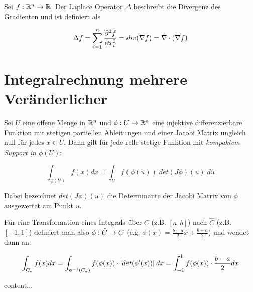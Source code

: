 \begin{definition}
	Sei $f : \mathbb{R}^n \rightarrow \mathbb{R}$. Der Laplace Operator $\Delta$ beschreibt die Divergenz des Gradienten und ist definiert als
	
	\begin{align*}
	\Delta f  = \sum_{i=1}^{n} \frac{\partial ^2f}{\partial x_i^2} = div(\nabla f) = \nabla \cdot (\nabla f)
	\end{align*}
\end{definition}

\pagebreak
	
\section{Integralrechnung mehrere Veränderlicher}

\begin{satz}
	Sei $U$ eine offene Menge in $\mathbb{R}^n$ und $\phi : U \rightarrow \mathbb{R}^n$ eine injektive differenzierbare Funktion mit stetigen partiellen Ableitungen und einer Jacobi Matrix ungleich null für jedes $x \in U$. Dann gilt für jede relle stetige Funktion mit \emph{kompaktem Support in $\phi(U)$}:
	
	\begin{equation}
		\int_{\phi(U)}	 f(x) dx = \int_U f(\phi(u)) |det(J \phi)(u)| du
 	\end{equation}
 	
 	Dabei bezeichnet $det(J \phi)(u)$ die Determinante der Jacobi Matrix von $\phi$ ausgewertet am Punkt $u$.
 	
 	Für eine Transformation eines Integrals über $C$ (z.B. $[a,b]$) nach $\hat{C}$ (z.B. $[-1,1]$) definiert man also $\phi : \hat{C} \rightarrow C$ (e.g. $\phi(x) = \frac{b - a}{2}x + \frac{b + a}{2}$) und wendet dann an:
 	
 	\begin{align*}
 		\int_{C_k} f(x) dx = \int_{\phi^{-1}(C_k)} f(\phi(x)) \cdot |det(\phi'(x))| \medspace dx = \int_{-1}^{1} f(\phi(x)) \cdot \frac{b - a}{2} dx
 	\end{align*}
	
\end{satz}

\begin{satz}
	content...
\end{satz}


